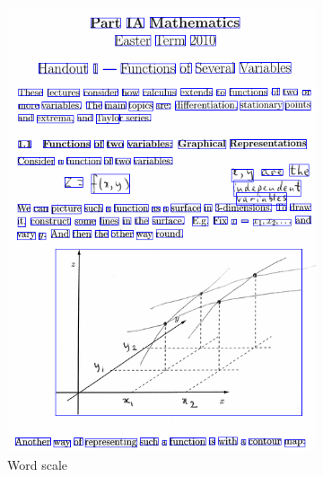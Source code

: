 \begin{figure}[!ht]
  \centering
  \begin{subfigure}{.42\textwidth}
    \includegraphics[width=\textwidth]{pla-word.png}
    \caption{Word scale}
  \end{subfigure}%
  \qquad
  \begin{subfigure}{.42\textwidth}

\end{subfigure}
\end{figure}
